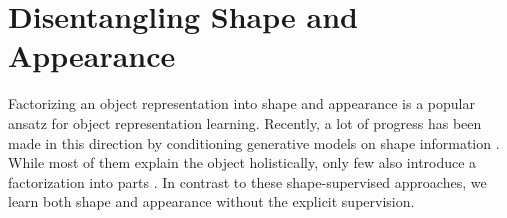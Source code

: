 
\section{Disentangling Shape and Appearance}
	Factorizing an object representation into shape and appearance is a popular ansatz for object representation learning.
	Recently, a lot of progress has been made in this direction by conditioning generative models on shape information \cite{esser18, ma17poseguided, debem18dgpose, ma17disperson, siarohin18deformgan, balakrishnan18unseenposes}.
	While most of them explain the object holistically, only few also introduce a factorization into parts \cite{siarohin18deformgan, balakrishnan18unseenposes}.
	In contrast to these shape-supervised approaches, we learn both shape and appearance without the explicit supervision.

